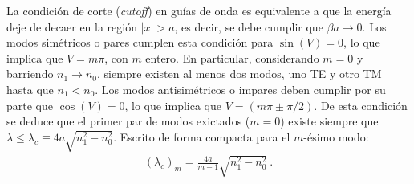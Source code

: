 La condición de corte (\textit{cutoff}) en guías de onda es equivalente a que la energía deje de decaer en la región $|x| > a$, es decir, se debe cumplir que $\beta a \to 0$. 
Los modos simétricos o pares cumplen esta condición para $\sin(V) = 0$, lo que implica que $V = m \pi$, con $m$ entero. En particular, considerando $m=0$  y barriendo $n_1 \to n_0$, siempre existen al menos dos modos, uno TE y otro TM hasta que $n_1 < n_0$.  
Los modos antisimétricos o impares deben cumplir por su parte que $\cos(V) = 0$, lo que implica que $V = (m\pi \pm \pi/2)$. De esta condición se deduce que el primer par de modos exictados ($m=0$) existe siempre que $\lambda \le \lambda_c \equiv 4a\sqrt{n_1^2-n_0^2}$. Escrito de forma compacta para el $m$-ésimo modo:
\begin{align*}
	 (\lambda_c)_m = \frac{4a}{m-1}  \sqrt{n_1^2-n_0^2} \ .
\end{align*}
